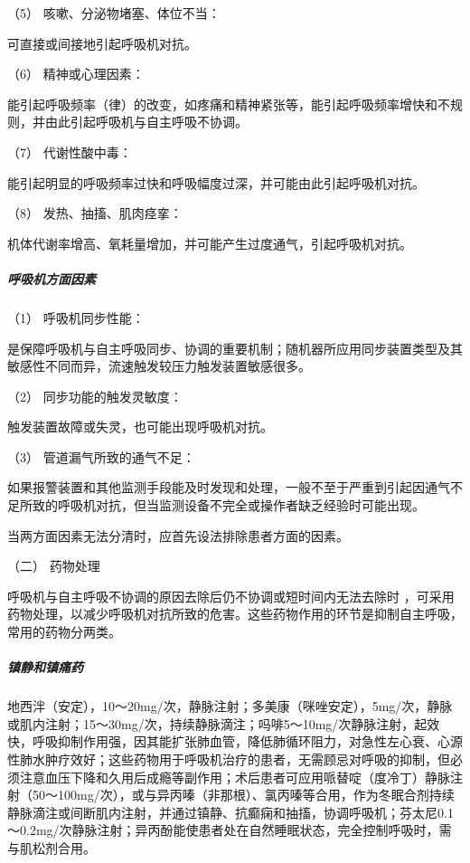\hypertarget{text00371.htmlux5cux23CHP16-3-5-2-1-1-5}{}
（5） 咳嗽、分泌物堵塞、体位不当：

可直接或间接地引起呼吸机对抗。

\hypertarget{text00371.htmlux5cux23CHP16-3-5-2-1-1-6}{}
（6） 精神或心理因素：

能引起呼吸频率（律）的改变，如疼痛和精神紧张等，能引起呼吸频率增快和不规则，并由此引起呼吸机与自主呼吸不协调。

\hypertarget{text00371.htmlux5cux23CHP16-3-5-2-1-1-7}{}
（7） 代谢性酸中毒：

能引起明显的呼吸频率过快和呼吸幅度过深，并可能由此引起呼吸机对抗。

\hypertarget{text00371.htmlux5cux23CHP16-3-5-2-1-1-8}{}
（8） 发热、抽搐、肌肉痉挛：

机体代谢率增高、氧耗量增加，并可能产生过度通气，引起呼吸机对抗。

\subparagraph{呼吸机方面因素}

\hypertarget{text00371.htmlux5cux23CHP16-3-5-2-1-2-1}{}
（1） 呼吸机同步性能：

是保障呼吸机与自主呼吸同步、协调的重要机制；随机器所应用同步装置类型及其敏感性不同而异，流速触发较压力触发装置敏感很多。

\hypertarget{text00371.htmlux5cux23CHP16-3-5-2-1-2-2}{}
（2） 同步功能的触发灵敏度：

触发装置故障或失灵，也可能出现呼吸机对抗。

\hypertarget{text00371.htmlux5cux23CHP16-3-5-2-1-2-3}{}
（3） 管道漏气所致的通气不足：

如果报警装置和其他监测手段能及时发现和处理，一般不至于严重到引起因通气不足所致的呼吸机对抗，但当监测设备不完全或操作者缺乏经验时可能出现。

当两方面因素无法分清时，应首先设法排除患者方面的因素。

\hypertarget{text00371.htmlux5cux23CHP16-3-5-2-2}{}
（二） 药物处理

呼吸机与自主呼吸不协调的原因去除后仍不协调或短时间内无法去除时
，可采用药物处理，以减少呼吸机对抗所致的危害。这些药物作用的环节是抑制自主呼吸，常用的药物分两类。

\subparagraph{镇静和镇痛药}

地西泮（安定），10～20mg/次，静脉注射；多美康（咪唑安定），5mg/次，静脉或肌内注射；15～30mg/次，持续静脉滴注；吗啡5～10mg/次静脉注射，起效快，呼吸抑制作用强，因其能扩张肺血管，降低肺循环阻力，对急性左心衰、心源性肺水肿疗效好；这些药物用于呼吸机治疗的患者，无需顾忌对呼吸的抑制，但必须注意血压下降和久用后成瘾等副作用；术后患者可应用哌替啶（度冷丁）静脉注射（50～100mg/次），或与异丙嗪（非那根）、氯丙嗪等合用，作为冬眠合剂持续静脉滴注或间断肌内注射，并通过镇静、抗癫痫和抽搐，协调呼吸机；芬太尼0.1～0.2mg/次静脉注射；异丙酚能使患者处在自然睡眠状态，完全控制呼吸时，需与肌松剂合用。

